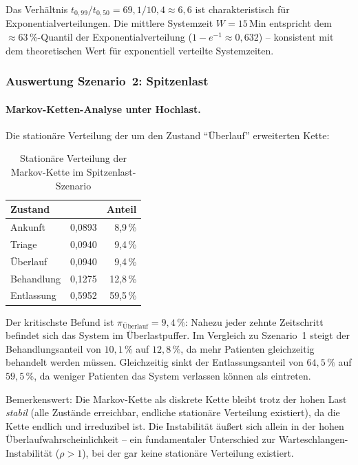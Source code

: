 ﻿\documentclass[a4paper,12pt]{scrreprt}
\theoremstyle{definition}
\begin{document}
Das Verhältnis $t_{0{,}99}/t_{0{,}50} = 69{,}1/10{,}4 \approx 6{,}6$ ist
charakteristisch für Exponentialverteilungen. Die mittlere Systemzeit
$W = 15$\,Min entspricht dem $\approx 63$\,\%-Quantil der Exponentialverteilung
($1 - e^{-1} \approx 0{,}632$) -- konsistent mit dem theoretischen Wert für
exponentiell verteilte Systemzeiten.

\subsubsection{Auswertung Szenario~2: Spitzenlast}

\paragraph{Markov-Ketten-Analyse unter Hochlast.}
Die stationäre Verteilung der um den Zustand ``Überlauf'' erweiterten Kette:

\begin{table}[H]
	\centering
	\begin{tabular}{@{}lrr@{}}
		\toprule
		\textbf{Zustand} & \boldmath{$\pi_i$} & \textbf{Anteil} \\
		\midrule
		Ankunft     & 0{,}0893 &  8{,}9\,\% \\
		Triage      & 0{,}0940 &  9{,}4\,\% \\
		Überlauf    & 0{,}0940 &  9{,}4\,\% \\
		Behandlung  & 0{,}1275 & 12{,}8\,\% \\
		Entlassung  & 0{,}5952 & 59{,}5\,\% \\
		\bottomrule
	\end{tabular}
	\caption{Stationäre Verteilung der Markov-Kette im Spitzenlast-Szenario}
	\label{tab:pi-hochlast}
\end{table}

Der kritischste Befund ist $\pi_\text{Überlauf} = 9{,}4\,\%$: Nahezu jeder
zehnte Zeitschritt befindet sich das System im Überlastpuffer. Im Vergleich
zu Szenario~1 steigt der Behandlungsanteil von $10{,}1\,\%$ auf $12{,}8\,\%$,
da mehr Patienten gleichzeitig behandelt werden müssen. Gleichzeitig sinkt
der Entlassungsanteil von $64{,}5\,\%$ auf $59{,}5\,\%$, da weniger Patienten
das System verlassen können als eintreten.

Bemerkenswert: Die Markov-Kette als diskrete Kette bleibt trotz der hohen
Last \emph{stabil} (alle Zustände erreichbar, endliche stationäre Verteilung
existiert), da die Kette endlich und irreduzibel ist. Die Instabilität
äußert sich allein in der hohen Überlaufwahrscheinlichkeit -- ein
fundamentaler Unterschied zur Warteschlangen-Instabilität ($\rho > 1$),
bei der gar keine stationäre Verteilung existiert.
\end{document}
